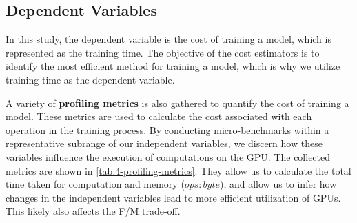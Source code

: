 \subsection{Dependent Variables}
In this study, the dependent variable is the cost of training a model, which is represented as the training time. The objective of the cost estimators is to identify the most efficient method for training a model, which is why we utilize training time as the dependent variable.

A variety of \textbf{profiling metrics} is also gathered to quantify the cost of training a model. These metrics are used to calculate the cost associated with each operation in the training process. By conducting micro-benchmarks within a representative subrange of our independent variables, we discern how these variables influence the execution of computations on the GPU. The collected metrics are shown in \autoref{tab:4-profiling-metrics}. They allow us to calculate the total time taken for computation and memory ($ops:byte$), and allow us to infer how changes in the independent variables lead to more efficient utilization of GPUs. This likely also affects the F/M trade-off.

